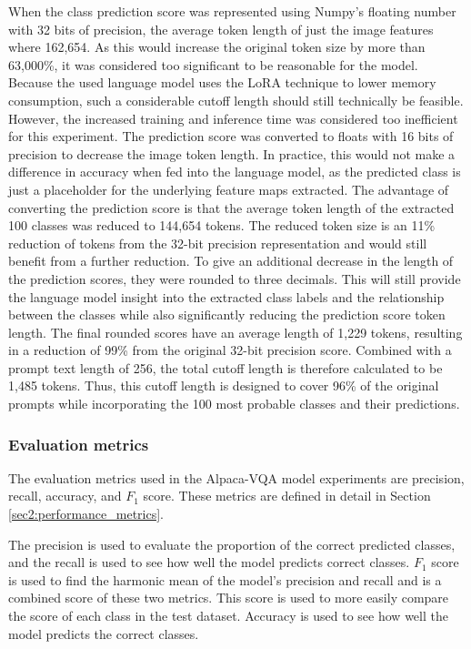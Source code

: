         When the class prediction score was represented using Numpy's floating number with 32 bits of precision, the average token length of just the image features where 162,654. As this would increase the original token size by more than 63,000\%, it was considered too significant to be reasonable for the model. Because the used language model uses the LoRA technique to lower memory consumption, such a considerable cutoff length should still technically be feasible. However, the increased training and inference time was considered too inefficient for this experiment.  
        The prediction score was converted to floats with 16 bits of precision to decrease the image token length. In practice, this would not make a difference in accuracy when fed into the language model, as the predicted class is just a placeholder for the underlying feature maps extracted. 
        The advantage of converting the prediction score is that the average token length of the extracted 100 classes was reduced to 144,654 tokens. The reduced token size is an 11\% reduction of tokens from the 32-bit precision representation and would still benefit from a further reduction. 
        To give an additional decrease in the length of the prediction scores, they were rounded to three decimals. This will still provide the language model insight into the extracted class labels and the relationship between the classes while also significantly reducing the prediction score token length. 
        The final rounded scores have an average length of 1,229 tokens, resulting in a reduction of 99\% from the original 32-bit precision score. 
        Combined with a prompt text length of 256, the total cutoff length is therefore calculated to be 1,485 tokens. 
        Thus, this cutoff length is designed to cover 96\% of the original prompts while incorporating the 100 most probable classes and their predictions. 

         


        \subsubsection{Evaluation metrics}
        The evaluation metrics used in the Alpaca-VQA model experiments are precision, recall, accuracy, and $F_1$ score. These metrics are defined in detail in Section \ref{sec2:performance_metrics}.
        
        The precision is used to evaluate the proportion of the correct predicted classes, and the recall is used to see how well the model predicts correct classes.
        $F_1$ score is used to find the harmonic mean of the model's precision and recall and is a combined score of these two metrics. This score is used to more easily compare the score of each class in the test dataset. 
        Accuracy is used to see how well the model predicts the correct classes. 
        
